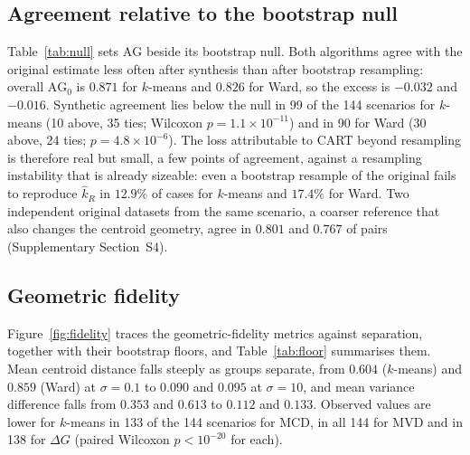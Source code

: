 \documentclass[pdflatex,referee]{sn-jnl}
\begin{document}
\subsection{Agreement relative to the bootstrap null}
\label{sec:excess}

Table~\ref{tab:null} sets $\mathrm{AG}$ beside its bootstrap null. Both
algorithms agree with the original estimate less often after synthesis than
after bootstrap resampling: overall $\mathrm{AG}_0$ is $0.871$ for $k$-means
and $0.826$ for Ward, so the excess is $-0.032$ and $-0.016$. Synthetic
agreement lies below the null in 99 of the 144 scenarios for $k$-means
(10 above, 35 ties; Wilcoxon $p = 1.1 \times 10^{-11}$) and in 90 for Ward
(30 above, 24 ties; $p = 4.8 \times 10^{-6}$). The loss attributable to CART
beyond resampling is therefore real but small, a few points of agreement,
against a resampling instability that is already sizeable: even a bootstrap
resample of the original fails to reproduce $\hat{k}_R$ in $12.9\%$ of cases
for $k$-means and $17.4\%$ for Ward. Two independent original datasets
from the same scenario, a coarser reference that also changes the centroid
geometry, agree in $0.801$ and $0.767$ of pairs (Supplementary Section~S4).

\begin{table}[t]
\centering
\caption{Agreement with the original estimate after CART synthesis
         ($\mathrm{AG}$) and after bootstrap resampling of the original data
         ($\mathrm{AG}_0$, $B = 30$ resamples per original dataset), and the
         excess $\mathrm{AG} - \mathrm{AG}_0$; negative values mean that
         synthesis loses agreement beyond resampling. Candidate range
         $\{2,\dots,8\}$. The excess is computed before rounding.}
\label{tab:null}
\small

\end{table}

\subsection{Geometric fidelity}
\label{sec:geometry}

Figure~\ref{fig:fidelity} traces the geometric-fidelity metrics against
separation, together with their bootstrap floors, and
Table~\ref{tab:floor} summarises them. Mean centroid distance falls steeply as
groups separate, from $0.604$ ($k$-means) and $0.859$ (Ward) at
$\sigma = 0.1$ to $0.090$ and $0.095$ at $\sigma = 10$, and mean variance
difference falls from $0.353$ and $0.613$ to $0.112$ and $0.133$. Observed
values are lower for $k$-means in 133 of the 144 scenarios for MCD, in all 144
for MVD and in 138 for $\Delta G$ (paired Wilcoxon $p < 10^{-20}$ for each).
\end{document}
